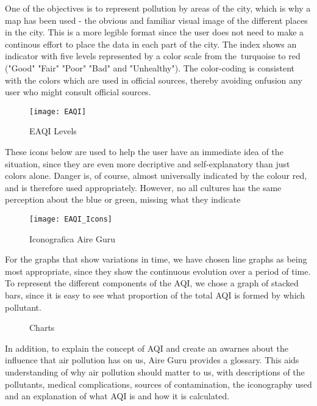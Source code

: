 One of the objectives is to represent pollution by areas of the city, which is why a map has been used - the 
obvious and familiar visual image of the different places in the city. This is a more legible format since the user
does not need to make a continous effort to place the data in each part of the city. The index shows an indicator with 
five levels represented by a color scale from the turquoise to red ("Good" "Fair" "Poor" "Bad" and "Unhealthy"). 
The color-coding is consistent with the colors which are used in official sources, thereby avoiding onfusion any 
user who might consult official sources.

\begin{figure}[ht]
    \centering
    \texttt{[image: EAQI]}
    \caption{EAQI Levels}
\end{figure}

These icons below are used to help the user have an immediate idea of the situation, since they are even more
decriptive and self-explanatory than just colors alone. Danger is, of course, almost universally indicated by 
the colour red, and is therefore used appropriately. However, no all cultures has the same perception about
the blue or green, missing what they indicate\\

\begin{figure}[ht]
    \centering
    \texttt{[image: EAQI\_Icons]}
    \caption{Iconografica Aire Guru}
\end{figure}

For the graphs that show variations in time,  we have chosen line graphs as being most appropriate,
since they show the continuous evolution over a period of time. To represent the different components of the AQI, we chose a
graph of stacked bars, since it is easy to see what proportion of the total AQI is formed by which pollutant. \\

\begin{figure}[ht]
    \centering
        \hfill
    \caption{Charts}
\end{figure}

In addition, to explain the concept of AQI and create an awarnes about the influence that air pollution has on us, Aire Guru provides a
glossary. This aids understanding of why air pollution should matter to us, with descriptions of the pollutants, medical complications, sources of contamination, the iconography used and
an explanation of what AQI is and how it is calculated. \\

